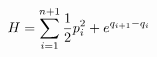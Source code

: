 \begin{equation}
H =  \sum_{i=1}^{n+1}{1\over 2} p_i^2 + e^{q_{i+1}-q_i}
\label{hamtoda}
\end{equation}

